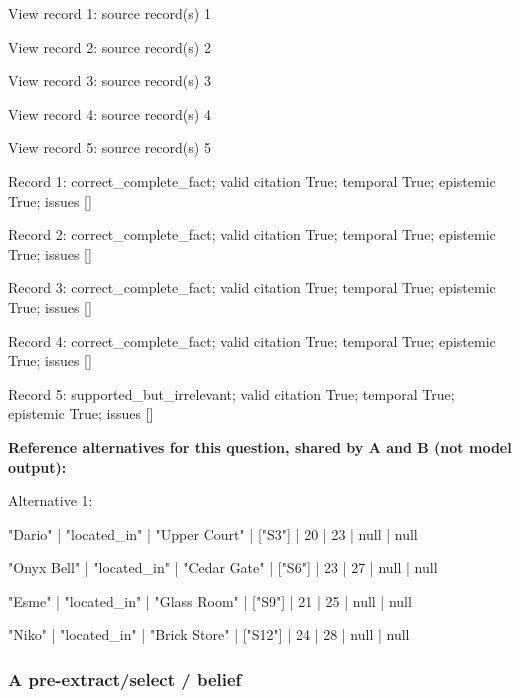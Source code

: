 View record 1: source record(s) 1\par

View record 2: source record(s) 2\par

View record 3: source record(s) 3\par

View record 4: source record(s) 4\par

View record 5: source record(s) 5\par

Record 1: correct\_complete\_fact; valid citation True; temporal True; epistemic True; issues []\par

Record 2: correct\_complete\_fact; valid citation True; temporal True; epistemic True; issues []\par

Record 3: correct\_complete\_fact; valid citation True; temporal True; epistemic True; issues []\par

Record 4: correct\_complete\_fact; valid citation True; temporal True; epistemic True; issues []\par

Record 5: supported\_but\_irrelevant; valid citation True; temporal True; epistemic True; issues []\par

\noindent\textbf{Reference alternatives for this question, shared by A and B (not model output):}

\noindent Alternative 1:

"Dario" | "located\_in" | "Upper Court" | ["S3"] | 20 | 23 | null | null\par\smallskip

"Onyx Bell" | "located\_in" | "Cedar Gate" | ["S6"] | 23 | 27 | null | null\par\smallskip

"Esme" | "located\_in" | "Glass Room" | ["S9"] | 21 | 25 | null | null\par\smallskip

"Niko" | "located\_in" | "Brick Store" | ["S12"] | 24 | 28 | null | null\par\smallskip

\subsubsection*{A pre-extract/select / belief}

